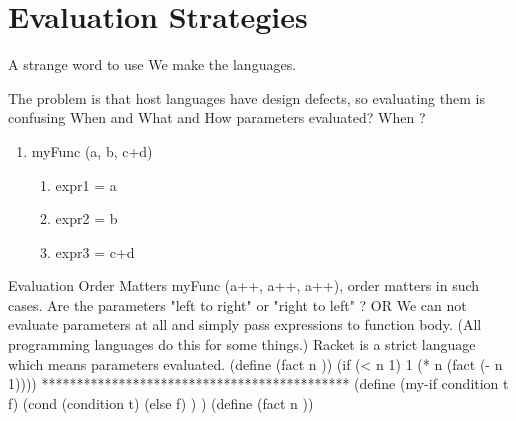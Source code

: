 \documentclass{article}
\begin{document}
\section{Evaluation Strategies}

\newline A strange word to use 
\newline We make the languages. 
\newline


The problem is that host languages have design defects, so evaluating them is confusing
\newline \newline
When and What and How parameters evaluated?
\newline \newline
When ?
\begin{enumerate}
    \item myFunc (a, b, c+d)
    \begin{enumerate}
        \item expr1 = a
        \item expr2 = b
        \item expr3 = c+d
    \end{enumerate}
\end{enumerate}
\newline
Evaluation Order Matters\newline
\newline
myFunc (a++, a++, a++), order matters in such cases.
\newline \newline
Are the parameters "left to right" or "right to left" ? 
\newline \newline
OR  We can not evaluate parameters at all and simply pass expressions to function body.
(All programming languages do this for some things.)
\newline \newline
Racket is a strict language which means parameters evaluated.
\newline \newline
(define (fact n ))
 (if (< n 1) 1 (* n (fact (- n 1))))
\newline \newline
********************************************
\newline
(define (my-if condition t f) 
 (cond
  (condition t)
  (else f)
 )
)
\newline
\newline
(define (fact n ))
\end{document}
